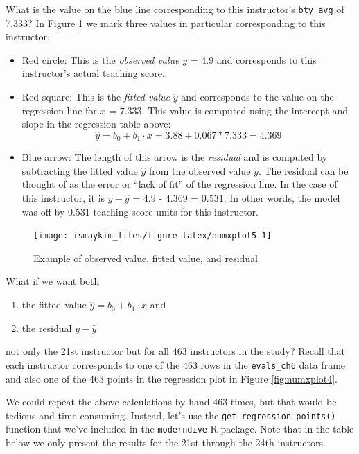 \documentclass[12pt, krantz2,]{krantz}
\providecommand{\tightlist}{%
  \setlength{\itemsep}{0pt}\setlength{\parskip}{0pt}}
\begin{document}
What is the value on the blue line corresponding to this instructor's \texttt{bty\_avg} of 7.333? In Figure \ref{fig:numxplot5} we mark three values in particular corresponding to this instructor.

\begin{itemize}
\tightlist
\item
  Red circle: This is the \emph{observed value} \(y\) = 4.9 and corresponds to this instructor's actual teaching score.
\item
  Red square: This is the \emph{fitted value} \(\widehat{y}\) and corresponds to the value on the regression line for \(x\) = 7.333. This value is computed using the intercept and slope in the regression table above: \[\widehat{y} = b_0 + b_1 \cdot x = 3.88 + 0.067 * 7.333 = 4.369\]
\item
  Blue arrow: The length of this arrow is the \emph{residual} and is computed by subtracting the fitted value \(\widehat{y}\) from the observed value \(y\). The residual can be thought of as the error or ``lack of fit'' of the regression line. In the case of this instructor, it is \(y - \widehat{y}\) = 4.9 - 4.369 = 0.531. In other words, the model was off by 0.531 teaching score units for this instructor.
\end{itemize}

\begin{figure}

{\centering \texttt{[image: ismaykim\_files/figure-latex/numxplot5-1]} 

}

\caption{Example of observed value, fitted value, and residual}\label{fig:numxplot5}
\end{figure}

What if we want both

\begin{enumerate}
\def\labelenumi{\arabic{enumi}.}
\tightlist
\item
  the fitted value \(\widehat{y} = b_0 + b_1 \cdot x\) and
\item
  the residual \(y - \widehat{y}\)
\end{enumerate}

not only the 21st instructor but for all 463 instructors in the study? Recall that each instructor corresponds to one of the 463 rows in the \texttt{evals\_ch6} data frame and also one of the 463 points in the regression plot in Figure \ref{fig:numxplot4}.

We could repeat the above calculations by hand 463 times, but that would be tedious and time consuming. Instead, let's use the \texttt{get\_regression\_points()} function that we've included in the \texttt{moderndive} R package. Note that in the table below we only present the results for the 21st through the 24th instructors.
\end{document}
